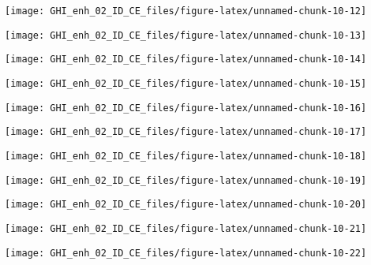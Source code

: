 \documentclass[
  10pt,
  a4paper,oneside]{article}
\begin{document}
\begin{center}\texttt{[image: GHI\_enh\_02\_ID\_CE\_files/figure-latex/unnamed-chunk-10-12]} \end{center}

\begin{center}\texttt{[image: GHI\_enh\_02\_ID\_CE\_files/figure-latex/unnamed-chunk-10-13]} \end{center}

\begin{center}\texttt{[image: GHI\_enh\_02\_ID\_CE\_files/figure-latex/unnamed-chunk-10-14]} \end{center}

\begin{center}\texttt{[image: GHI\_enh\_02\_ID\_CE\_files/figure-latex/unnamed-chunk-10-15]} \end{center}

\begin{center}\texttt{[image: GHI\_enh\_02\_ID\_CE\_files/figure-latex/unnamed-chunk-10-16]} \end{center}

\begin{center}\texttt{[image: GHI\_enh\_02\_ID\_CE\_files/figure-latex/unnamed-chunk-10-17]} \end{center}

\begin{center}\texttt{[image: GHI\_enh\_02\_ID\_CE\_files/figure-latex/unnamed-chunk-10-18]} \end{center}

\begin{center}\texttt{[image: GHI\_enh\_02\_ID\_CE\_files/figure-latex/unnamed-chunk-10-19]} \end{center}

\begin{center}\texttt{[image: GHI\_enh\_02\_ID\_CE\_files/figure-latex/unnamed-chunk-10-20]} \end{center}

\begin{center}\texttt{[image: GHI\_enh\_02\_ID\_CE\_files/figure-latex/unnamed-chunk-10-21]} \end{center}

\begin{center}\texttt{[image: GHI\_enh\_02\_ID\_CE\_files/figure-latex/unnamed-chunk-10-22]} \end{center}
\end{document}
